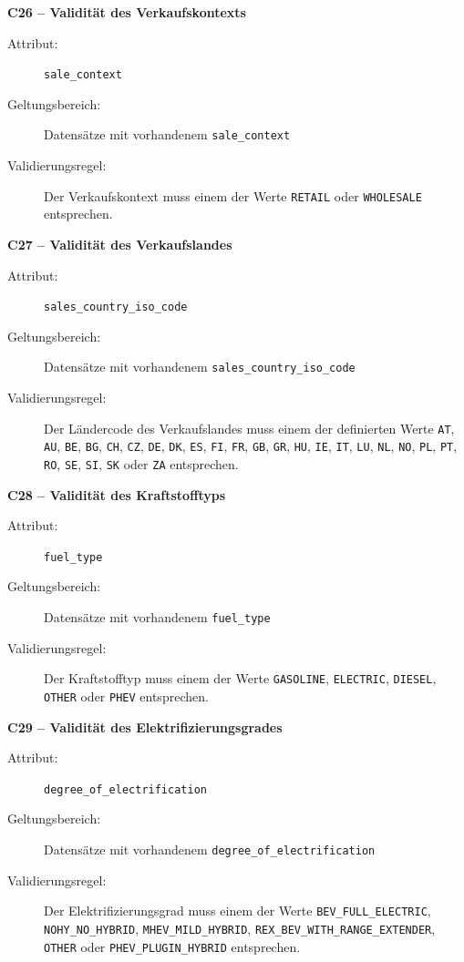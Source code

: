 \documentclass[../main.tex]{subfiles}
\begin{document}
\medskip
\noindent\textbf{C26 -- Validität des Verkaufskontexts}
\begin{description}
    \item[Attribut:] \texttt{sale\_context}
    \item[Geltungsbereich:] Datensätze mit vorhandenem \texttt{sale\_context}
    \item[Validierungsregel:] Der Verkaufskontext muss einem der Werte \texttt{RETAIL} oder \texttt{WHOLESALE} entsprechen.
\end{description}

\medskip
\noindent\textbf{C27 -- Validität des Verkaufslandes}
\begin{description}
    \item[Attribut:] \texttt{sales\_country\_iso\_code}
    \item[Geltungsbereich:] Datensätze mit vorhandenem \texttt{sales\_country\_iso\_code}
    \item[Validierungsregel:] Der Ländercode des Verkaufslandes muss einem der definierten Werte \texttt{AT}, \texttt{AU}, \texttt{BE}, \texttt{BG}, \texttt{CH}, \texttt{CZ}, \texttt{DE}, \texttt{DK}, \texttt{ES}, \texttt{FI}, \texttt{FR}, \texttt{GB}, \texttt{GR}, \texttt{HU}, \texttt{IE}, \texttt{IT}, \texttt{LU}, \texttt{NL}, \texttt{NO}, \texttt{PL}, \texttt{PT}, \texttt{RO}, \texttt{SE}, \texttt{SI}, \texttt{SK} oder \texttt{ZA} entsprechen.
\end{description}

\medskip
\noindent\textbf{C28 -- Validität des Kraftstofftyps}
\begin{description}
    \item[Attribut:] \texttt{fuel\_type}
    \item[Geltungsbereich:] Datensätze mit vorhandenem \texttt{fuel\_type}
    \item[Validierungsregel:] Der Kraftstofftyp muss einem der Werte \texttt{GASOLINE}, \texttt{ELECTRIC}, \texttt{DIESEL}, \texttt{OTHER} oder \texttt{PHEV} entsprechen.
\end{description}

\medskip
\noindent\textbf{C29 -- Validität des Elektrifizierungsgrades}
\begin{description}
    \item[Attribut:] \texttt{degree\_of\_electrification}
    \item[Geltungsbereich:] Datensätze mit vorhandenem \texttt{degree\_of\_electrification}
    \item[Validierungsregel:] Der Elektrifizierungsgrad muss einem der Werte \texttt{BEV\_FULL\_ELECTRIC}, \texttt{NOHY\_NO\_HYBRID}, \texttt{MHEV\_MILD\_HYBRID}, \texttt{REX\_BEV\_WITH\_RANGE\_EXTENDER}, \texttt{OTHER} oder \texttt{PHEV\_PLUGIN\_HYBRID} entsprechen.
\end{description}
\end{document}
